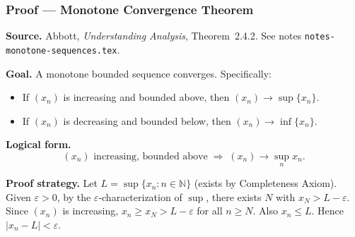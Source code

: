 
\clearpage
{}
\hypertarget{proof-RA-ABB-P-MCT}{}

\subsubsection[Monotone Convergence Theorem]{Proof --- Monotone Convergence Theorem}

\bigskip

\noindent
\textbf{Source.}
Abbott, \emph{Understanding Analysis}, Theorem~2.4.2.
See notes \texttt{notes-monotone-sequences.tex}.

\vspace{0.75em}

\noindent
\textbf{Goal.}
A monotone bounded sequence converges. Specifically:
\begin{itemize}
  \item If $(x_n)$ is increasing and bounded above, then $(x_n) \to \sup\{x_n\}$.
  \item If $(x_n)$ is decreasing and bounded below, then $(x_n) \to \inf\{x_n\}$.
\end{itemize}

\vspace{0.75em}

\noindent
\textbf{Logical form.}
\[
  (x_n) \text{ increasing, bounded above}
  \;\Rightarrow\;
  (x_n) \to \sup_{n} x_n.
\]

\vspace{0.75em}

\noindent
\textbf{Proof strategy.}
Let $L = \sup\{x_n : n \in \mathbb{N}\}$ (exists by Completeness Axiom).
Given $\varepsilon > 0$, by the $\varepsilon$-characterization of $\sup$, there
exists $N$ with $x_N > L - \varepsilon$. Since $(x_n)$ is increasing,
$x_n \ge x_N > L - \varepsilon$ for all $n \ge N$. Also $x_n \le L$.
Hence $|x_n - L| < \varepsilon$.

\vspace{0.75em}


